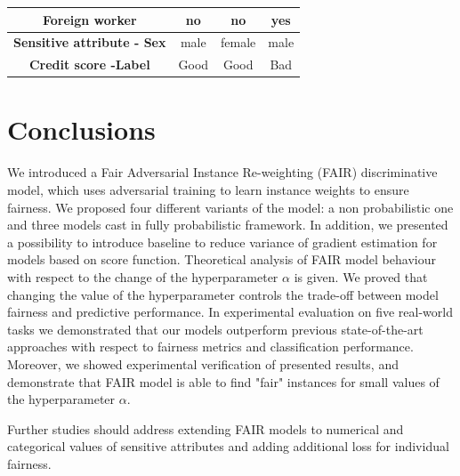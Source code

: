 \documentclass[preprint,12pt]{elsarticle}
\begin{document}
\begin{table}
{\begin{tabular}{|c|c|c|c|}
		\textbf{Foreign worker}                                  & no                         & no                                                                                   & yes                                                                                  \\ \hline
		\textbf{Sensitive attribute - Sex}                                             & male                       & female                                                                               & male                                                                                 \\ \hline
		\textbf{Credit score -Label}                                           & Good                       & Good                                                                                 & Bad                                                                                  \\ \hline
	\end{tabular}}
	\label{tab:Explainability}
\end{table}

\section{Conclusions}
\label{Sec:Conclusion}
We introduced a Fair Adversarial Instance Re-weighting (FAIR) discriminative model, which uses adversarial training to learn instance weights to ensure fairness. We proposed four different variants of the model: a non probabilistic one and three models cast in fully probabilistic framework. In addition, we presented a possibility to introduce baseline to reduce variance of gradient estimation for models based on score function. Theoretical analysis of FAIR model behaviour with respect to the change of the hyperparameter $\alpha$ is given. We proved that changing the value of the hyperparameter controls the trade-off between model fairness and predictive performance. In experimental evaluation on five real-world tasks we demonstrated that our models outperform previous state-of-the-art approaches with respect to fairness metrics and classification performance. Moreover, we showed experimental verification of presented results, and demonstrate that FAIR model is able to find "fair" instances for small values of the hyperparameter $\alpha$.

Further studies should address extending FAIR models to numerical and categorical values of sensitive attributes and adding additional loss for individual fairness.
\end{document}
